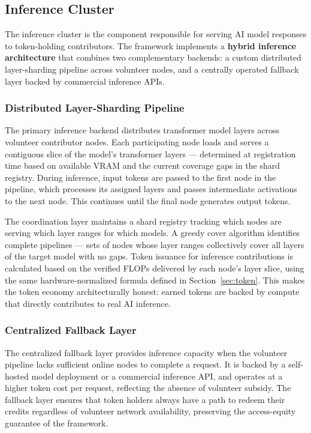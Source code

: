 \documentclass[12pt]{article}
\begin{document}
\subsection{Inference Cluster}

The inference cluster is the component responsible for serving AI model responses to token-holding contributors. The framework implements a \textbf{hybrid inference architecture} that combines two complementary backends: a custom distributed layer-sharding pipeline across volunteer nodes, and a centrally operated fallback layer backed by commercial inference APIs.

\subsubsection{Distributed Layer-Sharding Pipeline}

The primary inference backend distributes transformer model layers across volunteer contributor nodes. Each participating node loads and serves a contiguous slice of the model's transformer layers — determined at registration time based on available VRAM and the current coverage gaps in the shard registry. During inference, input tokens are passed to the first node in the pipeline, which processes its assigned layers and passes intermediate activations to the next node. This continues until the final node generates output tokens.

The coordination layer maintains a shard registry tracking which nodes are serving which layer ranges for which models. A greedy cover algorithm identifies complete pipelines — sets of nodes whose layer ranges collectively cover all layers of the target model with no gaps. Token issuance for inference contributions is calculated based on the verified FLOPs delivered by each node's layer slice, using the same hardware-normalized formula defined in Section~\ref{sec:token}. This makes the token economy architecturally honest: earned tokens are backed by compute that directly contributes to real AI inference.

\subsubsection{Centralized Fallback Layer}

The centralized fallback layer provides inference capacity when the volunteer pipeline lacks sufficient online nodes to complete a request. It is backed by a self-hosted model deployment or a commercial inference API, and operates at a higher token cost per request, reflecting the absence of volunteer subsidy. The fallback layer ensures that token holders always have a path to redeem their credits regardless of volunteer network availability, preserving the access-equity guarantee of the framework.
\end{document}
